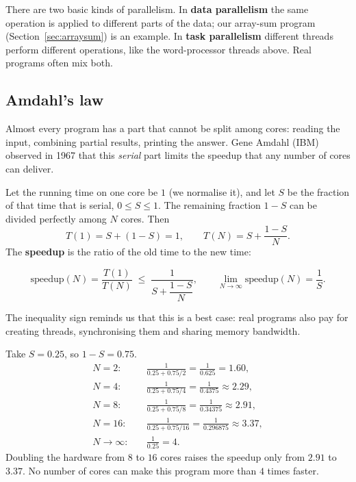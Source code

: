 \documentclass[11pt,a4paper]{article}
\newcommand{\term}[1]{\textbf{\color{mintdeep}#1}}
\begin{document}
There are two basic kinds of parallelism. In \term{data parallelism} the same operation is applied to different parts of the data; our array-sum program (Section~\ref{sec:arraysum}) is an example. In \term{task parallelism} different threads perform different operations, like the word-processor threads above. Real programs often mix both.

\subsection{Amdahl's law}

Almost every program has a part that cannot be split among cores: reading the input, combining partial results, printing the answer. Gene Amdahl (IBM) observed in 1967 that this \emph{serial} part limits the speedup that any number of cores can deliver.

Let the running time on one core be $1$ (we normalise it), and let $S$ be the fraction of that time that is serial, $0 \le S \le 1$. The remaining fraction $1-S$ can be divided perfectly among $N$ cores. Then
\[
T(1) = S + (1-S) = 1, \qquad T(N) = S + \frac{1-S}{N}.
\]
The \term{speedup} is the ratio of the old time to the new time:
\begin{keyidea}
\[
\text{speedup}(N) = \frac{T(1)}{T(N)} \;\le\; \frac{1}{S + \dfrac{1-S}{N}},
\qquad
\lim_{N\to\infty} \text{speedup}(N) = \frac{1}{S}.
\]
\end{keyidea}
The inequality sign reminds us that this is a best case: real programs also pay for creating threads, synchronising them and sharing memory bandwidth.

\begin{example}
Take $S = 0.25$, so $1-S = 0.75$.
\begin{align*}
N=2:&\quad \frac{1}{0.25 + 0.75/2} = \frac{1}{0.625} = 1.60,\\
N=4:&\quad \frac{1}{0.25 + 0.75/4} = \frac{1}{0.4375} \approx 2.29,\\
N=8:&\quad \frac{1}{0.25 + 0.75/8} = \frac{1}{0.34375} \approx 2.91,\\
N=16:&\quad \frac{1}{0.25 + 0.75/16} = \frac{1}{0.296875} \approx 3.37,\\
N\to\infty:&\quad \frac{1}{0.25} = 4.
\end{align*}
Doubling the hardware from $8$ to $16$ cores raises the speedup only from $2.91$ to $3.37$. No number of cores can make this program more than $4$ times faster.
\end{example}
\end{document}
